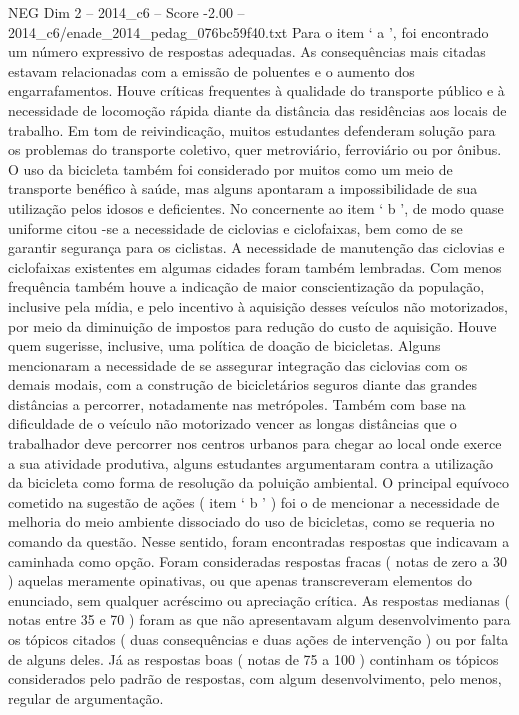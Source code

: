 \begin{textsample}{NEG Dim 2 – 2014\_c6 – Score -2.00 – 2014\_c6/enade\_2014\_pedag\_076bc59f40.txt}
Para o item ‘ a ’, foi encontrado um número expressivo de respostas adequadas.
As consequências mais citadas estavam relacionadas com a emissão de poluentes e o aumento dos engarrafamentos.
Houve críticas frequentes à qualidade do transporte público e à necessidade de locomoção rápida diante da distância das residências aos locais de trabalho.
Em tom de reivindicação, muitos estudantes defenderam solução para os problemas do transporte coletivo, quer metroviário, ferroviário ou por ônibus.
O uso da bicicleta também foi considerado por muitos como um meio de transporte benéfico à saúde, mas alguns apontaram a impossibilidade de sua utilização pelos idosos e deficientes.
No concernente ao item ‘ b ’, de modo quase uniforme citou -se a necessidade de ciclovias e ciclofaixas, bem como de se garantir segurança para os ciclistas.
A necessidade de manutenção das ciclovias e ciclofaixas existentes em algumas cidades foram também lembradas.
Com menos frequência também houve a indicação de maior conscientização da população, inclusive pela mídia, e pelo incentivo à aquisição desses veículos não motorizados, por meio da diminuição de impostos para redução do custo de aquisição.
Houve quem sugerisse, inclusive, uma política de doação de bicicletas.
Alguns mencionaram a necessidade de se assegurar integração das ciclovias com os demais modais, com a construção de bicicletários seguros diante das grandes distâncias a percorrer, notadamente nas metrópoles.
Também com base na dificuldade de o veículo não motorizado vencer as longas distâncias que o trabalhador deve percorrer nos centros urbanos para chegar ao local onde exerce a sua atividade produtiva, alguns estudantes argumentaram contra a utilização da bicicleta como forma de resolução da poluição ambiental.
O principal equívoco cometido na sugestão de ações ( item ‘ b ’ ) foi o de mencionar a necessidade de melhoria do meio ambiente dissociado do uso de bicicletas, como se requeria no comando da questão.
Nesse sentido, foram encontradas respostas que indicavam a caminhada como opção.
Foram consideradas respostas fracas ( notas de zero a 30 ) aquelas meramente opinativas, ou que apenas transcreveram elementos do enunciado, sem qualquer acréscimo ou apreciação crítica.
As respostas medianas ( notas entre 35 e 70 ) foram as que não apresentavam algum desenvolvimento para os tópicos citados ( duas consequências e duas ações de intervenção ) ou por falta de alguns deles.
Já as respostas boas ( notas de 75 a 100 ) continham os tópicos considerados pelo padrão de respostas, com algum desenvolvimento, pelo menos, regular de argumentação.

\end{textsample}
